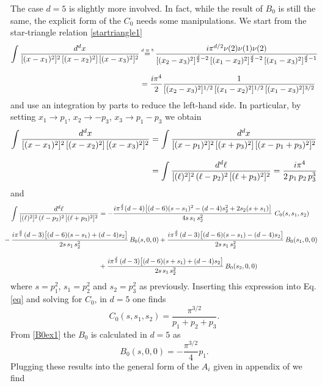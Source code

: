 \documentclass[a4paper,11pt,openright,twoside]{book}
\let\n=\nu      \let\x=\xi     \let\p=\pi      \let\r=\rho
\numberwithin{equation}{section}
\begin{document}
{{The case $d=5$ is slightly more involved. In fact, while the result of ${B}_0$ is still the same, the explicit form of the ${C}_0$ needs some manipulations. We start from the star-triangle relation \eqref{startriangle1} 
\begin{align}
	\int\frac{d^{d}x}{[(x-x_1)^2]^{2}\,[(x-x_2)^2]\,[(x-x_3)^2]^{2}}&\ \mathrel{\stackrel{\makebox[0pt]{\mbox{\normalfont\tiny $d=5$}}}{=}}\ \frac{i\pi^{d/2}\n(2)\n(1)\n(2)}{[(x_2-x_3)^2]^{\frac{d}{2}-2}\,[(x_1-x_2)^2]^{\frac{d}{2}-2}\,[(x_1-x_3)^2]^{\frac{d}{2}-1}}\\[2ex]
	&=\frac{i\p^4}{2}\frac{1}{[(x_2-x_3)^2]^{1/2}\,[(x_1-x_2)^2]^{1/2}\,[(x_1-x_3)^2]^{3/2}}\label{eq}
\end{align}
and use an integration by parts to reduce the left-hand side. In particular, by setting $x_1\to p_1$, $x_2\to -p_3$, $x_3\to p_1-p_3$ we obtain
\begin{align}
	\int\frac{d^{d}x}{[(x-x_1)^2]^{2}\,[(x-x_2)^2]\,[(x-x_3)^2]^{2}}&=\int\frac{d^{d}x}{[(x-p_1)^2]^{2}\,[(x+p_3)^2]\,[(x-p_1+p_3)^2]^{2}}\notag\\[2ex]
	&=\int\frac{d^{d}\ell}{[(\ell)^2]^{2}\,(\ell-p_2)^2\,[(\ell+p_3)^2]^{2}}=\frac{i\p^4}{2\,p_1\,p_2\,p_3^3}
\end{align}
and 
\begin{align}
	\int\frac{d^{d}\ell}{[(\ell)^2]^{2}\,(\ell-p_2)^2\,[(\ell+p_3)^2]^{2}}&=-\frac{i\p^\frac{d}{2}(d-4)\big[(d-6)(s-s_1)^2-(d-4)s_2^2+2s_2(s+s_1)\big]}{4s\,s_1\,s_2^2}\ {C}_0(s,s_1,s_2)\notag\\[2ex]
	&\hspace{-5cm}-\frac{i\p^\frac{d}{2}\,(d-3)\big[(d-6)(s-s_1)+(d-4)s_2\big]}{2s\,s_1\,s_2^2}\,{B}_0(s,0,0)+\frac{i\p^\frac{d}{2}\,(d-3)\big[(d-6)(s-s_1)-(d-4)s_2\big]}{2s\,s_1\,s_2^2}\,{B}_0(s_1,0,0)\notag\\[2ex]
	&+\frac{i\p^\frac{d}{2}\,(d-3)\big[(d-6)(s+s_1)+(d-4)s_2\big]}{2s\,s_1\,s_2^2}\,{B}_0(s_2,0,0)
\end{align}
where $s=p_1^2$, $s_1=p_2^2$ and $s_2=p_3^2$ as previously. Inserting this expression into Eq. \eqref{eq} and solving for ${C}_0$, in $d=5$ one finds
\begin{equation}
	{C}_0(s,s_1,s_2)=\frac{\p^{3/2}}{p_1+p_2+p_3}.
\end{equation}
From \eqref{B0ex1} the $B_0$ is calculated in $d=5$ as
\begin{equation}
	{B}_0(s,0,0)=-\frac{\p^{3/2}}{4} p_1.
\end{equation}
Plugging these results into the general form of the $A_i$ given in appendix of \cite{Coriano:2018bbe} we find
}}
\end{document}
